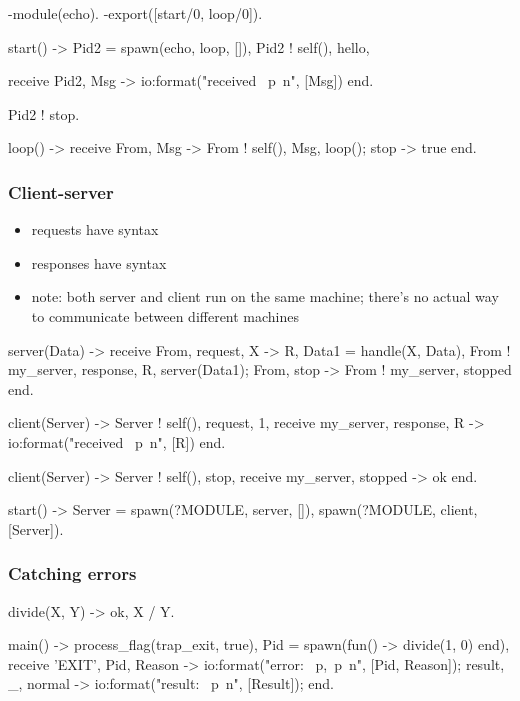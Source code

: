 \documentclass[a4paper,landscape,10pt]{article}
\begin{document}
\begin{multicols*}{2}
  \begin{erlang}
-module(echo).
-export([start/0, loop/0]).

start() ->
  Pid2 = spawn(echo, loop, []),
  Pid2 ! {self(), hello},

  receive
    {Pid2, Msg} -> io:format("received ~p~n", [Msg])
  end.

Pid2 ! stop.

loop() ->
  receive
    {From, Msg} ->
      From ! {self(), Msg},
    loop();
    stop ->
      true
  end.
\end{erlang}

  \breakcolumn

  \subsubsection{Client-server}

  \begin{itemize}
    \item requests have syntax 
    \item responses have syntax 
    \item note: both server and client run on the same machine; there's no actual way to communicate between different machines
  \end{itemize}

  \begin{erlang}
server(Data) ->
  receive
    {From, {request, X}} ->
      {R, Data1} = handle(X, Data),
      From ! {my_server, {response, R}},
      server(Data1);
    {From, stop} ->
      From ! {my_server, stopped}
  end.

client(Server) ->
  Server ! {self(), {request, 1}},
  receive
    {my_server, {response, R}} ->
      io:format("received ~p~n", [R])
  end.

client(Server) ->
  Server ! {self(), stop},
  receive
    {my_server, stopped} -> ok
  end.

start() ->
  Server = spawn(?MODULE, server, []),
  spawn(?MODULE, client, [Server]).
\end{erlang}

  \columnbreak

  \subsubsection{Catching errors}

  \begin{erlang}

  divide(X, Y) ->
    {ok, X / Y}.

  main() ->
    process_flag(trap_exit, true), %
    Pid = spawn(fun() -> divide(1, 0) end),
    receive
      {'EXIT', Pid, Reason} -> %
        io:format("error: ~p,~p~n", [Pid, Reason]);
      {result, _, normal} ->  %
        io:format("result: ~p~n", [Result]);
    end.
\end{erlang}

\end{multicols*}
\end{document}
